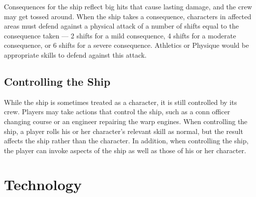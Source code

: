 \documentclass[12pt,titlepage,openany]{book}
\begin{document}
Consequences for the ship reflect big hits that cause lasting damage, and the
crew may get tossed around. When the ship takes a consequence, characters in
affected areas must defend against a physical attack of a number of shifts
equal to the consequence taken --- 2 shifts for a mild consequence, 4 shifts
for a moderate consequence, or 6 shifts for a severe consequence. Athletics or
Physique would be appropriate skills to defend against this attack.

\section{Controlling the Ship}\label{sec:control-ship}

While the ship is sometimes treated as a character, it is still controlled by
its crew. Players may take actions that control the ship, such as a conn
officer changing course or an engineer repairing the warp engines. When
controlling the ship, a player rolls his or her character's relevant skill as
normal, but the result affects the ship rather than the character. In addition,
when controlling the ship, the player can invoke aspects of the ship as well as
those of his or her character.



\chapter{Technology}\label{chap:technology}

\begin{center}
    \hspace*{1em}
    \hspace*{1em}
\end{center}
\end{document}
